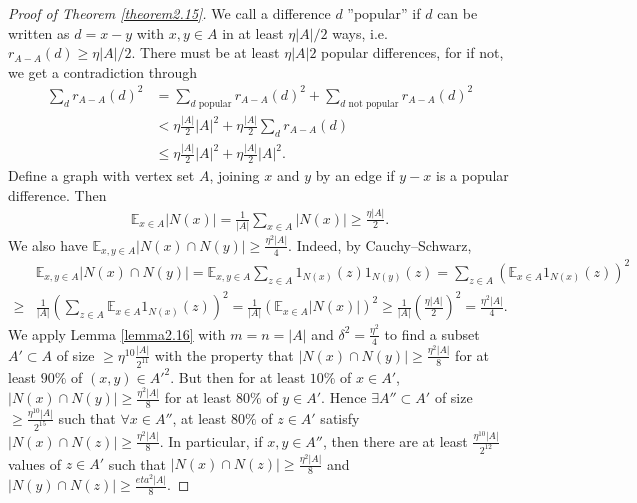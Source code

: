 \documentclass{article}
\theoremstyle{definition}
\begin{document}
\begin{proof}[Proof of Theorem \ref{theorem2.15}]
    We call a difference $d$ ''popular'' if $d$ can be written as $d = x-y$ with $x,y \in A$ in at least $\eta \left|A\right|/2$ ways, i.e. $r_{A-A}(d)\ge \eta\left|A\right|/2$. There must be at least $\eta \left|A\right|2$ popular differences, for if not, we get a contradiction through
    \begin{align*}
        \sum_{d}^{} r_{A-A}(d)^2 &= \sum_{d \text{ popular}}^{} r_{A-A}(d)^2 + \sum_{d \text{ not popular}}^{} r_{A-A}(d)^2 \\
        &< \eta \frac{\left|A\right|}{2}\left|A\right|^2 + \eta \frac{\left|A\right|}{2}\sum_{d }^{} r_{A-A}(d) \\
        &\le \eta \frac{\left|A\right|}{2}\left|A\right|^2 + \eta \frac{\left|A\right|}{2}\left|A\right|^2.
    \end{align*}
    Define a graph with vertex set $A$, joining $x$ and $y$ by an edge if $y-x$ is a popular difference. Then 
    \begin{align*}
        \mathbb{E}_{x \in A} \left|N(x)\right| = \frac{1}{\left|A\right|}\sum_{x \in A}^{} \left|N(x)\right| \ge \frac{\eta \left|A\right|}{2}.
    \end{align*}
    We also have $\mathbb{E}_{x, y \in A}\left|N(x) \cap N(y)\right|\ge \frac{\eta^2\left|A\right|}{4}$. Indeed, by Cauchy--Schwarz,
    \begin{align*}
        &\mathbb{E}_{x,y \in A}\left|N(x) \cap N(y)\right| = \mathbb{E}_{x,y \in A}\sum_{z \in A}^{} 1_{N(x)}(z)1_{N(y)}(z) = \sum_{z \in A}^{} \left(\mathbb{E}_{x \in A}1_{N(x)}(z)\right)^2 \\
        \ge& \frac{1}{\left|A\right|} \left(\sum_{z \in A}^{} \mathbb{E}_{x \in A}1_{N(x)}(z)\right)^2 = \frac{1}{\left|A\right|}\left(\mathbb{E}_{x \in A}\left|N(x)\right|\right)^2 \ge \frac{1}{\left|A\right|} \left(\frac{\eta \left|A\right|}{2}\right)^2 = \frac{\eta^2 \left|A\right|}{4}. 
    \end{align*}
    We apply Lemma \ref{lemma2.16} with $m=n=\left|A\right|$ and $\delta^2 = \frac{\eta^2}{4}$ to find a subset $A' \subset A$ of size $\ge \eta^{10}\frac{\left|A\right|}{2^{11}}$ with the property that $\left|N(x) \cap N(y)\right| \ge \frac{\eta^2\left|A\right|}{8}$ for at least $90\%$ of $(x,y) \in A'^2$. But then for at least $10\%$ of $x \in A'$, $\left|N(x) \cap N(y)\right| \ge \frac{\eta^2 \left|A\right|}{8}$ for at least $80\%$ of $y \in A'$. Hence $\exists  A'' \subset A'$ of size $\ge \frac{\eta^{10}\left|A\right|}{2^{15}}$ such that $\forall x \in A''$, at least $80\%$ of $z \in A'$ satisfy $\left|N(x) \cap N(z)\right|\ge \frac{\eta^2\left|A\right|}{8}$. In particular, if $x,y \in A''$, then there are at least $\frac{\eta^{10}\left|A\right|}{2^{12}}$ values of $z \in A'$ such that $\left|N(x) \cap N(z)\right|\ge \frac{\eta^2\left|A\right|}{8}$ and $\left|N(y) \cap N(z)\right|\ge \frac{eta^2\left|A\right|}{8}$.
    \vspace{1mm}
     

\end{proof}
\end{document}
